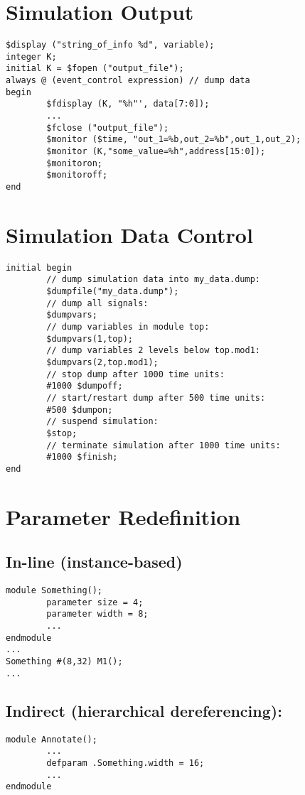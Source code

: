 \documentclass[10pt,twocolumn]{article}
\begin{document}
\section*{Simulation Output}\vspace{-10pt}
\begin{lstlisting}
$display ("string_of_info %d", variable);
integer K;
initial K = $fopen ("output_file");
always @ (event_control expression) // dump data
begin
        $fdisplay (K, "%h"', data[7:0]);
        ...
        $fclose ("output_file");
        $monitor ($time, "out_1=%b,out_2=%b",out_1,out_2);
        $monitor (K,"some_value=%h",address[15:0]);
        $monitoron;
        $monitoroff;
end
\end{lstlisting}
%
\section*{Simulation Data Control}\vspace{-10pt}
\begin{lstlisting}
initial begin
        // dump simulation data into my_data.dump:
        $dumpfile("my_data.dump");
        // dump all signals:
        $dumpvars;
        // dump variables in module top:
        $dumpvars(1,top);
        // dump variables 2 levels below top.mod1:
        $dumpvars(2,top.mod1);
        // stop dump after 1000 time units:
        #1000 $dumpoff;
        // start/restart dump after 500 time units:
        #500 $dumpon;
        // suspend simulation:
        $stop;
        // terminate simulation after 1000 time units:
        #1000 $finish;
end
\end{lstlisting}
%
\section*{Parameter Redefinition}
\subsection*{In-line (instance-based)}\vspace{-10pt}
\begin{lstlisting}
module Something();
        parameter size = 4;
        parameter width = 8;
        ...
endmodule
...
Something #(8,32) M1();
...
\end{lstlisting}\vspace{-10pt}
\subsection*{Indirect (hierarchical dereferencing):}\vspace{-10pt}
\begin{lstlisting}
module Annotate();
        ...
        defparam .Something.width = 16;
        ...
endmodule
\end{lstlisting}
%
\end{document}

